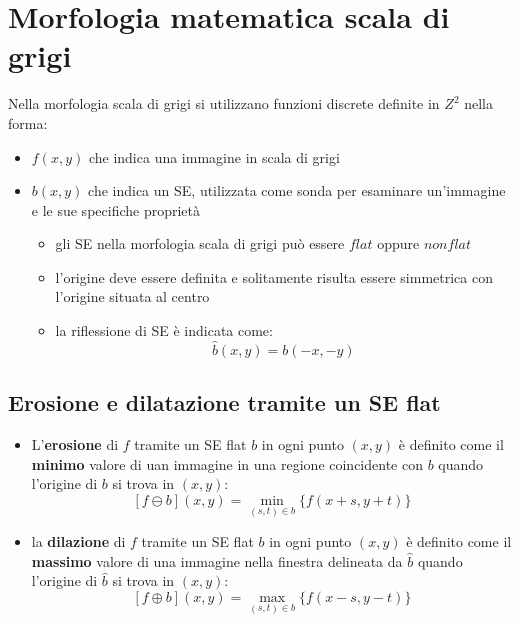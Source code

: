 \chapter{Morfologia matematica scala di grigi}
Nella morfologia scala di grigi si utilizzano funzioni discrete definite in $Z^2$ nella forma:
\begin{itemize}
	\item $f(x, y)$ che indica una immagine in scala di grigi
	
	\item $b(x, y)$ che indica un SE, utilizzata come sonda per esaminare un'immagine e le sue specifiche proprietà
	\begin{itemize}
		\item gli SE nella morfologia scala di grigi può essere $flat$ oppure $nonflat$
		\item l'origine deve essere definita e solitamente risulta essere simmetrica con l'origine situata al centro
		
		\item la riflessione di SE è indicata come:
		$$
		\hat{b} (x, y) = b (-x, -y)
		$$
	\end{itemize}
\end{itemize}

\section{Erosione e dilatazione tramite un SE flat}
\begin{itemize}
	\item L'\textbf{erosione} di $f$ tramite un SE flat $b$ in ogni punto $(x, y)$ è definito come il \textbf{minimo} valore di uan immagine in una regione coincidente con $b$ quando l'origine di $b$ si trova in $(x, y)$:
	$$
	[f \ominus b] (x, y) = \displaystyle\min_{(s, t) \in b} \{f(x + s, y + t)\}
	$$
	
	\item la \textbf{dilazione} di $f$ tramite un SE flat $b$ in ogni punto $(x, y)$ è definito come il \textbf{massimo} valore di una immagine nella finestra delineata da $\hat{b}$ quando l'origine di $\hat{b}$ si trova in $(x, y)$:
	$$
	[f \oplus b] (x, y) = \displaystyle\max_{(s, t) \in b} \{f(x - s, y - t)\}
	$$
\end{itemize}

